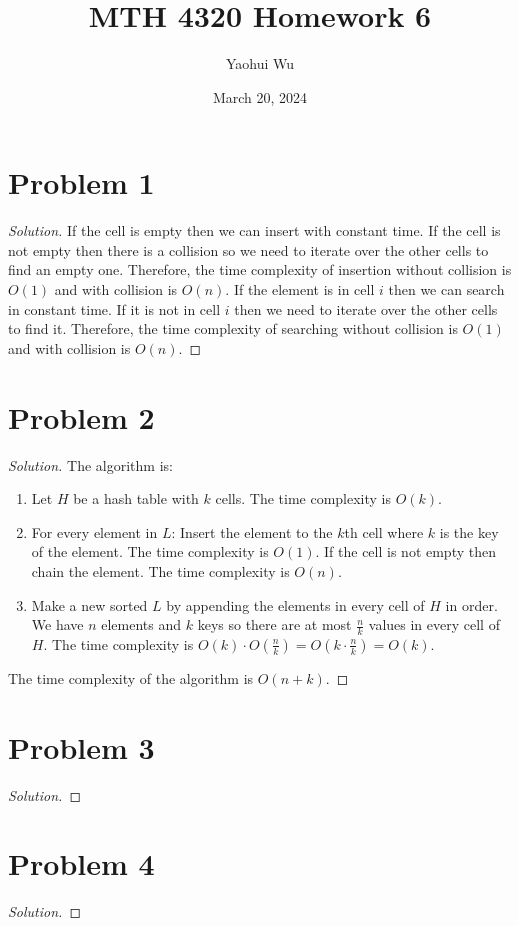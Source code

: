 \documentclass[12pt]{article}
\title{MTH 4320 Homework 6}
\author{Yaohui Wu}
\date{March 20, 2024}
\newenvironment*{solution}{\begin{proof}[Solution]}{\end{proof}}
\begin{document}
\maketitle
\section*{Problem 1}
\begin{solution}
    If the cell is empty then we can insert with constant time. If the cell is
    not empty then there is a collision so we need to iterate over the other
    cells to find an empty one. Therefore, the time complexity of insertion
    without collision is \(O(1)\) and with collision is \(O(n)\). If the
    element is in cell \(i\) then we can search in constant time. If it is not
    in cell \(i\) then we need to iterate over the other cells to find it.
    Therefore, the time complexity of searching without collision is \(O(1)\)
    and with collision is \(O(n)\).
\end{solution}
\section*{Problem 2}
\begin{solution}
    The algorithm is:
    \begin{enumerate}
        \item Let \(H\) be a hash table with \(k\) cells. The time complexity
        is \(O(k)\).
        \item For every element in \(L\): Insert the element to the \(k\)th
        cell where \(k\) is the key of the element. The time complexity is
        \(O(1)\). If the cell is not empty then chain the element. The time
        complexity is \(O(n)\).
        \item Make a new sorted \(L\) by appending the elements in every cell
        of \(H\) in order. We have \(n\) elements and \(k\) keys so there are
        at most \(\frac{n}{k}\) values in every cell of \(H\). The time
        complexity is \(O(k)\cdot O(\frac{n}{k})=O(k\cdot\frac{n}{k})=O(k)\).
    \end{enumerate}
    The time complexity of the algorithm is \(O(n+k)\).
\end{solution}
\section*{Problem 3}
\begin{solution}
    
\end{solution}
\section*{Problem 4}
\begin{solution}
    
\end{solution}
\end{document}
